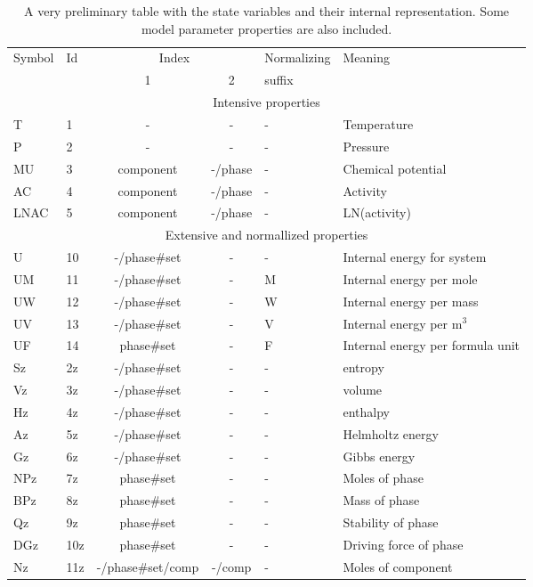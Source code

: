 \documentclass[12pt]{article}
\begin{document}
\begin{table}[!h]
\caption{A very preliminary table with the state variables and their
internal representation.  Some model parameter properties are also
included.}\label{tab:statevar}
\begin{tabular}{|llccll|}\hline
Symbol & Id & \multicolumn{2}{c}{Index} & Normalizing & Meaning\\
       &    & 1 & 2                     &  suffix     & \\\hline
\multicolumn{6}{|c|}{Intensive properties}\\\hline
T      & 1  & -         & -    & - & Temperature\\
P      & 2  & -         & -    & - & Pressure\\
MU     & 3  & component & -/phase  & - & Chemical potential\\
AC     & 4  & component & -/phase  & - & Activity\\
LNAC   & 5  & component & -/phase  & - & LN(activity)\\\hline
\multicolumn{6}{|c|}{Extensive and normallized properties}\\\hline
U      & 10 & -/phase\#set & - & - & Internal energy for system\\
UM     & 11 & -/phase\#set & - & M & Internal energy per mole\\
UW     & 12 & -/phase\#set & - & W & Internal energy per mass\\
UV     & 13 & -/phase\#set & - & V & Internal energy per m$^3$\\
UF     & 14 & phase\#set   & - & F & Internal energy per formula unit\\
Sz     & 2z & -/phase\#set & - & - & entropy\\
Vz     & 3z & -/phase\#set & - & - & volume\\
Hz     & 4z & -/phase\#set & - & - & enthalpy\\
Az     & 5z & -/phase\#set & - & - & Helmholtz energy\\
Gz     & 6z & -/phase\#set & - & - & Gibbs energy\\
NPz    & 7z &  phase\#set & - & - & Moles of phase\\
BPz    & 8z & phase\#set & - & - & Mass of phase\\
Qz     & 9z & phase\#set & - & -  & Stability of phase\\
DGz    & 10z & phase\#set & - & -  & Driving force of phase\\
Nz     & 11z & -/phase\#set/comp & -/comp & -  & Moles of component\\

\end{tabular}
\end{table}
\end{document}
